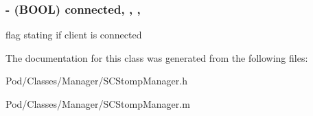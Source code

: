 \subsubsection[{\texorpdfstring{connected}{connected}}]{\setlength{\rightskip}{0pt plus 5cm}-\/ (B\+O\+OL) connected\hspace{0.3cm}{\ttfamily [read]}, {\ttfamily [write]}, {\ttfamily [nonatomic]}, {\ttfamily [assign]}}\hypertarget{interface_s_c_stomp_manager_a1d8713585f042229ddf6acd5412700ee}{}\label{interface_s_c_stomp_manager_a1d8713585f042229ddf6acd5412700ee}
flag stating if client is connected 

The documentation for this class was generated from the following files\+:\begin{DoxyCompactItemize}
\item 
Pod/\+Classes/\+Manager/S\+C\+Stomp\+Manager.\+h\item 
Pod/\+Classes/\+Manager/S\+C\+Stomp\+Manager.\+m\end{DoxyCompactItemize}

